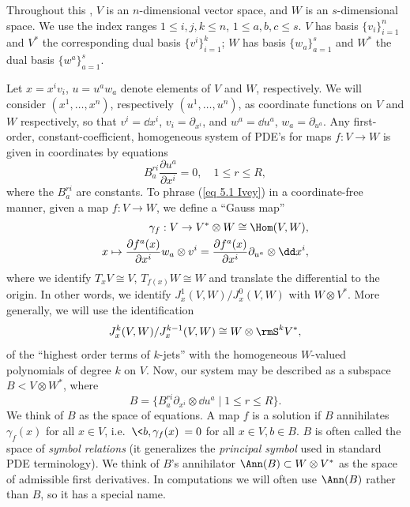 Throughout this \sect, $V$ is an $n$-dimensional vector space, and $W$ is an $s$-dimensional space. We use the index ranges $1\leq i,j,k\leq n$, $1\leq a,b,c\leq s$. $V$ has basis $\{v_i\}_{i=1}^n$ and $V^\ast$ the corresponding dual basis $\{v^i\}_{i=1}^k$; $W$ has basis $\{w_a\}_{a=1}^s$ and $W^\ast$ the dual basis $\{w^a\}_{a=1}^s$.

Let $x=x^iv_i$, $u=u^aw_a$ denote elements of $V$ and $W$, respectively. We will consider $(x^1,\ldots,x^n)$, respectively $(u^1,\ldots,u^n)$, as coordinate functions on $V$ and $W$ respectively, so that $v^i=\dd x^i$, $v_i=\partial_{x^i}$, and $w^a=\dd u^a$, $w_a=\partial_{u^a}$. Any first-order, constant-coefficient, homogeneous system of PDE's for maps $f:V\to W$ is given in coordinates by equations
\[B_a^{ri}\frac{\partial u^a}{\partial x^i}=0,\quad 1\leq r\leq R,\label{eq 5.1 Ivey}\]
where the $B_a^{ri}$ are constants. 
To phrase (\ref{eq 5.1 Ivey}) in a coordinate-free manner, given a map $f:V\to W$, we define a ``Gauss map''
\begin{align}
    \gamma_f:V\to V^\ast\otimes W\cong \Hom(V,W),\\
    x\mapsto \frac{\partial f^a(x)}{\partial x^i}w_a\otimes v^i=\frac{\partial f^a(x)}{\partial x^i} \partial_{u^a}\otimes \dd x^i,
\end{align}
where we identify $T_xV\cong V$, $T_{f(x)}W\cong W$ and translate the differential to the origin. In other words, we identify $J^1_x(V,W)\slash J^0_x(V,W)$ with $W\otimes V^\ast$. More generally, we will use the identification
\[J^k_x(V,W)\slash J^{k-1}_x(V,W)\cong W\otimes \rmS^k V^\ast,\]
of the ``highest order terms of $k$-jets'' with the homogeneous $W$-valued polynomials of degree $k$ on $V$. Now, our system may be described as a subspace $B<V\otimes W^\ast$, where 
\[B=\{B_a^{ri}\partial_{x^i}\otimes\dd u^a\mid 1\leq r\leq R\}.\]
We think of $B$ as the space of equations. A map $f$ is a solution if $B$ annihilates $\gamma_f(x)$ for all $x\in V$, i.e.\ $\<b,\gamma_f(x)\>=0$ for all $x\in V,b\in B$.
$B$ is often called the space of \emph{symbol relations} (it generalizes the \emph{principal symbol} used in standard PDE terminology). We think of $B$'s annihilator $\Ann(B)\subset W\otimes V^\ast$ as the space of admissible first derivatives. In computations we will often use $\Ann(B)$ rather than $B$, so it has a special name.


